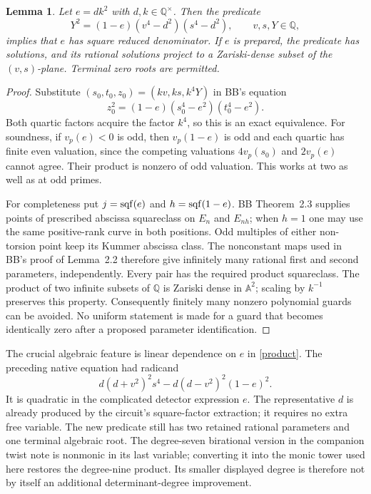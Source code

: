 \documentclass[11pt]{article}
\newtheorem{lemma}[theorem]{Lemma}
\newcommand{\Q}{\mathbb Q}\newcommand{\Z}{\mathbb Z}
\begin{document}
\begin{lemma}\label{pole}
Let $e=dk^2$ with $d,k\in\Q^\times$. Then the predicate
\begin{equation}\label{product}
 Y^2=(1-e)(v^4-d^2)(s^4-d^2),\qquad v,s,Y\in\Q,
\end{equation}
implies that $e$ has square reduced denominator. If $e$ is prepared,
the predicate has solutions, and its rational solutions project to a
Zariski-dense subset of the $(v,s)$-plane. Terminal zero roots are permitted.
\end{lemma}
\begin{proof}
Substitute $(s_0,t_0,z_0)=(kv,ks,k^4Y)$ in BB's equation
\[
 z_0^2=(1-e)(s_0^4-e^2)(t_0^4-e^2).
\]
Both quartic factors acquire the factor $k^4$, so this is an exact
equivalence. For soundness, if $v_p(e)<0$ is odd, then $v_p(1-e)$ is
odd and each quartic has finite even valuation, since the competing
valuations $4v_p(s_0)$ and $2v_p(e)$ cannot agree. Their product is
nonzero of odd valuation. This works at two as well as at odd primes.

For completeness put $j=\operatorname{sqf}(e)$ and $h=\operatorname{sqf}(1-e)$. BB Theorem~2.3
supplies points of prescribed abscissa squareclass on $E_n$ and $E_{nh}$;
when $h=1$ one may use the same positive-rank curve in both positions.
Odd multiples of either non-torsion point keep its Kummer abscissa class.
The nonconstant maps used in BB's proof of Lemma~2.2 therefore give
infinitely many rational first and second parameters, independently.
Every pair has the required product squareclass. The product of two
infinite subsets of $\Q$ is Zariski dense in $\mathbb A^2$; scaling by
$k^{-1}$ preserves this property. Consequently finitely many nonzero
polynomial guards can be avoided. No uniform statement is made for a
guard that becomes identically zero after a proposed parameter identification.
\end{proof}

The crucial algebraic feature is linear dependence on $e$ in
\eqref{product}. The preceding native equation had radicand
\[
 d(d+v^2)^2s^4-d(d-v^2)^2(1-e)^2.
\]
It is quadratic in the complicated detector expression $e$. The
representative $d$ is already produced by the circuit's square-factor
extraction; it requires no extra free variable. The new predicate still
has two retained rational parameters and one terminal algebraic root.
The degree-seven birational version in the companion twist note is
nonmonic in its last variable; converting it into the monic tower used
here restores the degree-nine product. Its smaller displayed degree is
therefore not by itself an additional determinant-degree improvement.
\end{document}
